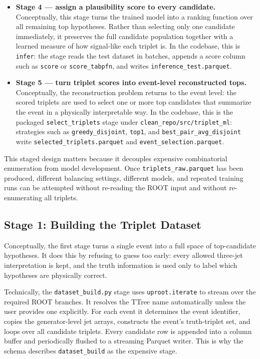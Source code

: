 \documentclass[11pt]{article}
\begin{document}
\begin{itemize}[leftmargin=*]
  \item \textbf{Stage 4 --- assign a plausibility score to every candidate.} Conceptually, this stage turns the trained model into a ranking function over all remaining top hypotheses. Rather than selecting only one candidate immediately, it preserves the full candidate population together with a learned measure of how signal-like each triplet is. In the codebase, this is \texttt{infer}: the stage reads the test dataset in batches, appends a score column such as \texttt{score} or \texttt{score\_tabpfn}, and writes \texttt{inference\_test.parquet}.
  \item \textbf{Stage 5 --- turn triplet scores into event-level reconstructed tops.} Conceptually, the reconstruction problem returns to the event level: the scored triplets are used to select one or more top candidates that summarize the event in a physically interpretable way. In the codebase, this is the packaged \texttt{select\_triplets} stage under \texttt{clean\_repo/src/triplet\_ml}: strategies such as \texttt{greedy\_disjoint}, \texttt{top1}, and \texttt{best\_pair\_avg\_disjoint} write \texttt{selected\_triplets.parquet} and \texttt{event\_selection.parquet}.
\end{itemize}

This staged design matters because it decouples expensive combinatorial enumeration from model development. Once \texttt{triplets\_raw.parquet} has been produced, different balancing settings, different models, and repeated training runs can be attempted without re-reading the ROOT input and without re-enumerating all triplets.

\subsection{Stage 1: Building the Triplet Dataset}

Conceptually, the first stage turns a single event into a full space of top-candidate hypotheses. It does this by refusing to guess too early: every allowed three-jet interpretation is kept, and the truth information is used only to label which hypotheses are physically correct.

Technically, the \texttt{dataset\_build.py} stage uses \texttt{uproot.iterate} to stream over the required ROOT branches. It resolves the TTree name automatically unless the user provides one explicitly. For each event it determines the event identifier, copies the generator-level jet arrays, constructs the event's truth-triplet set, and loops over all candidate triplets. Every candidate row is appended into a column buffer and periodically flushed to a streaming Parquet writer. This is why the schema describes \texttt{dataset\_build} as the expensive stage.
\end{document}
